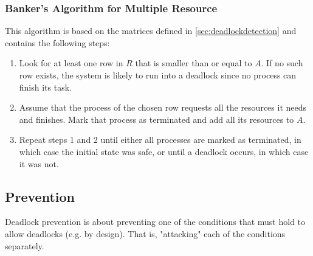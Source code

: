\documentclass[a4paper, 11pt, accentcolor = tud3b]{tudreport}
\begin{document}
                \subsubsection{Banker's Algorithm for Multiple Resource}
	                This algorithm is based on the matrices defined in \ref{sec:deadlockdetection} and contains the following steps:
                    \begin{enumerate}
                    	\item Look for at least one row in \(R\) that is smaller than or equal to \(A\). If no such row exists, the system is likely to run into a deadlock since no process can finish its task.
                    	\item Assume that the process of the chosen row requests all the resources it needs and finishes. Mark that process as terminated and add all its resources to \(A\).
                    	\item Repeat steps 1 and 2 until either all processes are marked as terminated, in which case the initial state was safe, or until a deadlock occurs, in which case it was not.
                    \end{enumerate}

            \subsection{Prevention}
                Deadlock prevention is about preventing one of the conditions that must hold to allow deadlocks (e.g. by design). That is, "attacking" each of the conditions separately.
\end{document}
